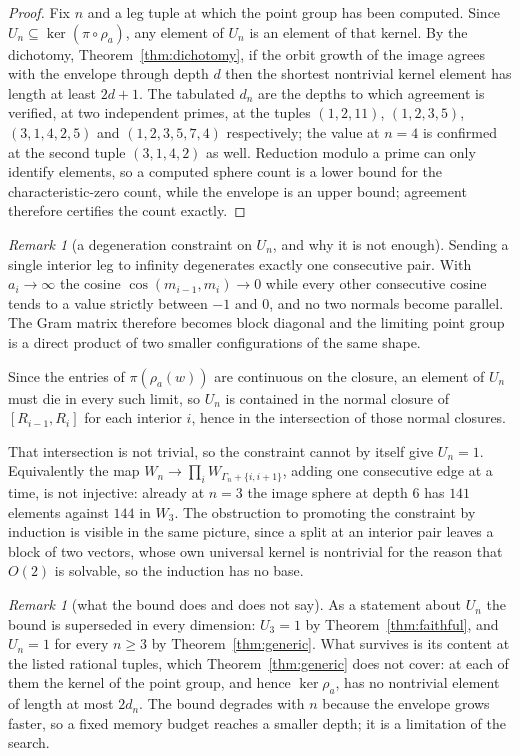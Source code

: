 \documentclass[11pt]{article}
\theoremstyle{definition}
\theoremstyle{remark}
\newtheorem{remark}[theorem]{Remark}
\theoremstyle{definition}
\begin{document}
\begin{proof}
Fix $n$ and a leg tuple at which the point group has been computed. Since
$U_n\subseteq\ker(\pi\circ\rho_a)$, any element of $U_n$ is an element of that kernel. By the
dichotomy, Theorem~\ref{thm:dichotomy}, if the orbit growth of the image agrees with the envelope
through depth $d$ then the shortest nontrivial kernel element has length at least $2d+1$. The
tabulated $d_n$ are the depths to which agreement is verified, at two independent primes, at the
tuples $(1,2,11)$, $(1,2,3,5)$, $(3,1,4,2,5)$ and $(1,2,3,5,7,4)$ respectively; the value at
$n=4$ is confirmed at the second tuple $(3,1,4,2)$ as well. Reduction modulo a prime can only
identify elements, so a computed sphere count is a lower bound for the characteristic-zero count,
while the envelope is an upper bound; agreement therefore certifies the count exactly.
\end{proof}

\begin{remark}[a degeneration constraint on $U_n$, and why it is not enough]\label{rem:degen}
Sending a single interior leg to infinity degenerates exactly one consecutive pair. With
$a_i\to\infty$ the cosine $\cos(m_{i-1},m_i)\to0$ while every other consecutive cosine tends to a
value strictly between $-1$ and $0$, and no two normals become parallel. The Gram matrix therefore
becomes block diagonal and the limiting point group is a direct product of two smaller
configurations of the same shape.

Since the entries of $\pi(\rho_a(w))$ are continuous on the closure, an element of $U_n$ must die
in every such limit, so $U_n$ is contained in the normal closure of $[R_{i-1},R_i]$ for each
interior $i$, hence in the intersection of those normal closures.

That intersection is not trivial, so the constraint cannot by itself give $U_n=1$. Equivalently
the map $W_n\to\prod_iW_{\Gamma_n+\{i,i+1\}}$, adding one consecutive edge at a time, is not
injective: already at $n=3$ the image sphere at depth $6$ has $141$ elements against $144$ in
$W_3$. The obstruction to promoting the constraint by induction is visible in the same picture,
since a split at an interior pair leaves a block of two vectors, whose own universal kernel is
nontrivial for the reason that $O(2)$ is solvable, so the induction has no base.
\end{remark}

\begin{remark}[what the bound does and does not say]\label{rem:Uboundmeaning}
As a statement about $U_n$ the bound is superseded in every dimension: $U_3=1$ by
Theorem~\ref{thm:faithful}, and $U_n=1$ for every $n\ge3$ by Theorem~\ref{thm:generic}. What
survives is its content at the listed rational tuples, which Theorem~\ref{thm:generic} does not
cover: at each of them the kernel of the point group, and hence $\ker\rho_a$, has no nontrivial
element of length at most $2d_n$. The bound degrades with $n$ because the envelope grows faster,
so a fixed memory budget reaches a smaller depth; it is a limitation of the search.
\end{remark}
\end{document}
